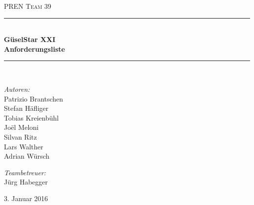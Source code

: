 \begin{titlepage}   

\begin{center}
\textsc{\Large PREN Team 39}\\[0.5cm]

\newcommand{\HRule}{\rule{\linewidth}{0.5mm}}
\HRule \\[0.4cm]
{ \huge \bfseries GüselStar XXI}\\[0.4cm]
{ \huge \bfseries Anforderungsliste}\\[0.4cm]
\HRule \\[1.5cm]

\begin{minipage}{0.4\textwidth}
\begin{flushleft} \large
\emph{Autoren:}\\
Patrizio Brantschen\\
Stefan Häfliger\\
Tobias Kreienbühl\\
Joël Meloni\\
Silvan Ritz\\
Lars Walther\\
Adrian Würsch
\end{flushleft}
\end{minipage}
\hfill
\begin{minipage}{0.4\textwidth}
\begin{flushright} \large
\emph{Teambetreuer:} \\
Jürg Habegger
\end{flushright}
\end{minipage}

\vfill

{\large 3. Januar 2016}

\end{center}
\end{titlepage}